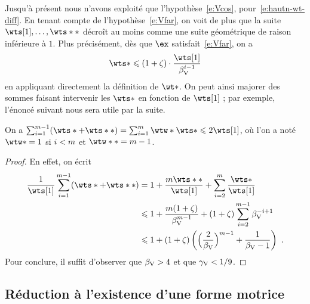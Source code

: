 Jusqu'à présent nous n'avons exploité que l'hypothèse~\eqref{e:Vcos},
pour~\eqref{e:hautn-wt-diff}. En tenant compte de l'hypothèse~\eqref{e:Vfar}, on
voit de plus que la suite \( \wts[1], \dots, \wts** \) décroît
au moins comme une suite géométrique de raison inférieure à \( 1 \). Plus
précisément, dès que \( \ex \) satisfait~\eqref{e:Vfar}, on a
\begin{equation} \label{e:wt-geom}
  \wts*
  \le
  (1+\zeta) \cdot \frac{\wts[1]}{\Vfar^{\fct-1}}
\end{equation}
en appliquant directement la définition de \( \wt* \). On peut ainsi majorer
des sommes faisant intervenir les \( \wts* \) en fonction de \( \wts[1] \) ;
par exemple, l'énoncé suivant nous sera utile par la suite.

\begin{lem} \label{l:sum-wts}
  On a \(
    \sum_{\fct=1}^{\puiss-1} (\wts* + \wts**)
    = \sum\fctrange \wtw* \wts*
    \le 2 \wts[1]
  \), où l'on a noté \( \wtw* = 1 \) si \( i < m \) et \( \wtw** =
    \puiss - 1 \).
\end{lem}

\begin{proof}
  En effet, on écrit
  \begin{align}
    \frac1{\wts[1]} \sum_{\fct=1}^{\puiss-1} (\wts* + \wts**)
    & = 1
    + \frac{\puiss \wts**}{\wts[1]}
    + \sum_{\fct=2}^\puiss \frac{\wts*}{\wts[1]}
    \\
    & \le 1
    + \frac{\puiss(1+\zeta)}{\Vfar^{\puiss-1}}
    + (1+\zeta) \sum_{\fct=2}^{\puiss-1} \Vfar^{-\fct+1}
    \\
    & \le 1 + (1+\zeta) \left(
      \Bigl( \frac2\Vfar \Bigr)^{\puiss-1}
      + \frac1{\Vfar-1}
    \right)
    \pmm.
  \end{align}
  Pour conclure, il suffit d'observer que \( \beta \sb{\mathrm{V}} > 4 \) et que \( \gamma \sb{\mathrm{V}} <
    1/9 \).
\end{proof}


\subsection{Réduction à l'existence d'une forme motrice}
\label{sec:vojta-prop}

